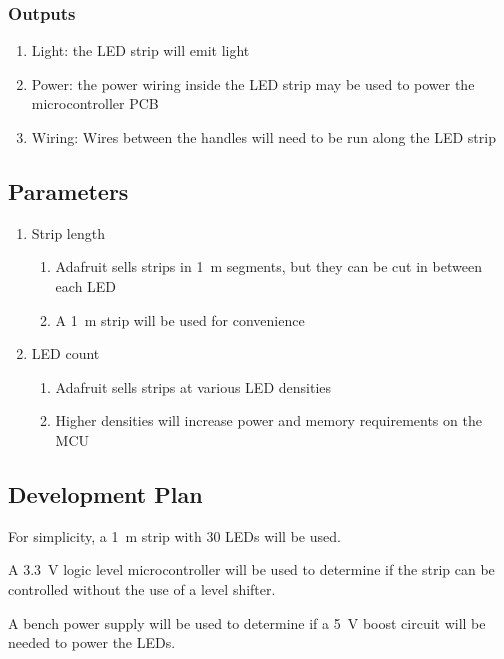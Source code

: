 \documentclass{notes}
\begin{document}
\subsubsection{Outputs}

\begin{enumerate}
    \item Light: the LED strip will emit light
    \item Power: the power wiring inside the LED strip may be used to power the microcontroller PCB
    \item Wiring: Wires between the handles will need to be run along the LED strip
\end{enumerate}

\subsection{Parameters}

\begin{enumerate}
    \item Strip length
    \begin{enumerate}
        \item Adafruit sells strips in \SI{1}{\meter} segments, but they can be cut in between each LED
        \item A \SI{1}{\meter} strip will be used for convenience
    \end{enumerate}
    \item LED count
    \begin{enumerate}
        \item Adafruit sells strips at various LED densities
        \item Higher densities will increase power and memory requirements on the MCU
    \end{enumerate}
\end{enumerate}

\subsection{Development Plan}

For simplicity, a \SI{1}{\meter} strip with 30 LEDs will be used.

A \SI{3.3}{\volt} logic level microcontroller will be used to determine if the strip can be controlled without the use of a level shifter.

A bench power supply will be used to determine if a \SI{5}{\volt} boost circuit will be needed to power the LEDs.
\end{document}
